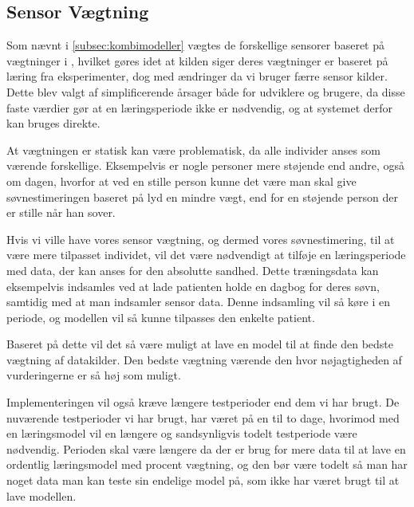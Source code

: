 \subsection{Sensor Vægtning}
Som nævnt i \cref{subsec:kombimodeller} vægtes de forskellige sensorer baseret på vægtninger i \citet{6563918}, hvilket gøres idet at kilden siger deres vægtninger er baseret på læring fra eksperimenter, dog med ændringer da vi bruger færre sensor kilder.
Dette blev valgt af simplificerende årsager både for udviklere og brugere, da disse faste værdier gør at en læringsperiode ikke er nødvendig, og at systemet derfor kan bruges direkte.

At vægtningen er statisk kan være problematisk, da alle individer anses som værende forskellige. 
Eksempelvis er nogle personer mere støjende end andre, også om dagen, hvorfor at ved en stille person kunne det være man skal give søvnestimeringen baseret på lyd en mindre vægt, end for en støjende person der er stille når han sover.

Hvis vi ville have vores sensor vægtning, og dermed vores søvnestimering, til at være mere tilpasset individet, vil det være nødvendigt at tilføje en læringsperiode med data, der kan anses for den absolutte sandhed.
Dette træningsdata kan eksempelvis indsamles ved at lade patienten holde en dagbog for deres søvn, samtidig med at man indsamler sensor data.
Denne indsamling vil så køre i en periode, og modellen vil så kunne tilpasses den enkelte patient.

Baseret på dette vil det så være muligt at lave en model til at finde den bedste vægtning af datakilder.
Den bedste vægtning værende den hvor nøjagtigheden af vurderingerne er så høj som muligt.

Implementeringen vil også kræve længere testperioder end dem vi har brugt.
De nuværende testperioder vi har brugt, har været på en til to dage, hvorimod med en læringsmodel vil en længere og sandsynligvis todelt testperiode være nødvendig.
Perioden skal være længere da der er brug for mere data til at lave en ordentlig læringsmodel med procent vægtning, og den bør være todelt så man har noget data man kan teste sin endelige model på, som ikke har været brugt til at lave modellen.

